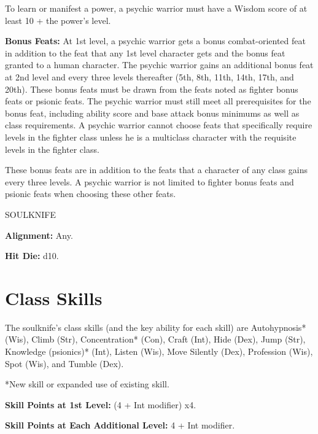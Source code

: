 \documentclass{article}
\begin{document}
To learn or manifest a power, a psychic warrior must have a Wisdom score of at 
least 10 + the power's level.

\textbf{Bonus Feats: }At 1st level, a psychic warrior gets a bonus combat-oriented 
feat in addition to the feat that any 1st level character gets and the bonus feat 
granted to a human character. The psychic warrior gains an additional bonus feat 
at 2nd level and every three levels thereafter (5th, 8th, 11th, 14th, 17th, and 
20th). These bonus feats must be drawn from the feats noted as fighter bonus feats 
or psionic feats. The psychic warrior must still meet all prerequisites for the 
bonus feat, including ability score and base attack bonus minimums as well as class 
requirements. A psychic warrior cannot choose feats that specifically require levels 
in the fighter class unless he is a multiclass character with the requisite levels 
in the fighter class.

These bonus feats are in addition to the feats that a character of any class gains 
every three levels. A psychic warrior is not limited to fighter bonus feats and 
psionic feats when choosing these other feats.

\vspace{12pt}
{\LARGE{}SOULKNIFE}

\textbf{Alignment:} Any.

\textbf{Hit Die:} d10.

\vspace{12pt}
\section*{\textbf{Class Skills}}

The soulknife's class skills (and the key ability for each skill) are Autohypnosis* 
(Wis), Climb (Str), Concentration* (Con), Craft (Int), Hide (Dex), Jump (Str), 
Knowledge (psionics)* (Int), Listen (Wis), Move Silently (Dex), Profession (Wis), 
Spot (Wis), and Tumble (Dex).

*New skill or expanded use of existing skill.

\textbf{Skill Points at 1st Level:} (4 + Int modifier) x4.

\textbf{Skill Points at Each Additional Level:} 4 + Int modifier.
\end{document}
